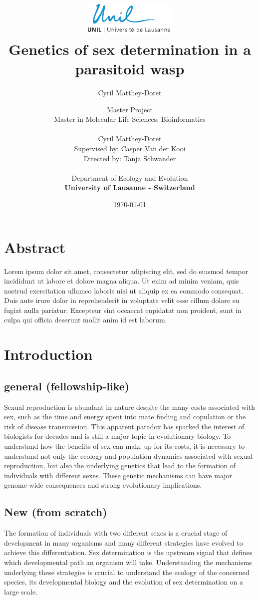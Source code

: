 \documentclass[11pt,a4paper]{report}
\author{Cyril Matthey-Doret}
\title{
\includegraphics[width=1.75in]{lo_unil06_bleu.pdf} \\
\vspace*{1in}
\textbf{Genetics of sex determination in a parasitoid wasp}}
\author{\Large{Master Project}\\
		Master in Molecular Life Sciences, Bioinformatics\\
				\vspace*{0.5in} \\
		Cyril Matthey-Doret\\
        Supervised by: Casper Van der Kooi\\
        Directed by: Tanja Schwander\\
		\vspace*{0.5in} \\
		Department of Ecology and Evolution\\
        \textbf{University of Lausanne - Switzerland}\\
       } \date{\today}
\begin{document}
\renewcommand{\headrulewidth}{1pt}
\maketitle

\section*{Abstract}
Lorem ipsum dolor sit amet, consectetur adipiscing elit, sed do eiusmod tempor incididunt ut labore et dolore magna aliqua. Ut enim ad minim veniam, quis nostrud exercitation ullamco laboris nisi ut aliquip ex ea commodo consequat. Duis aute irure dolor in reprehenderit in voluptate velit esse cillum dolore eu fugiat nulla pariatur. Excepteur sint occaecat cupidatat non proident, sunt in culpa qui officia deserunt mollit anim id est laborum.

\section*{Introduction}

\subsection*{general (fellowship-like)}
Sexual reproduction is abundant in nature despite the many costs associated with sex, such as the time and energy spent into mate finding and copulation or the risk of disease transmission. This apparent paradox has sparked the interest of biologists for decades and is still a major topic in evolutionary biology. To understand how the benefits of sex can make up for its costs, it is necessary to understand not only the ecology and population dynamics associated with sexual reproduction, but also the underlying genetics that lead to the formation of individuals with different sexes. These genetic mechanisms can have major genome-wide consequences and strong evolutionary implications. 

\subsection*{New (from scratch)}

The formation of individuals with two different sexes is a crucial stage of development in many organisms and many different strategies have evolved to achieve this differentiation. Sex determination is the upstream signal that defines which developmental path an organism will take.  Understanding the mechanisms underlying these strategies is crucial to understand the ecology of the concerned species, its developmental biology and the evolution of sex determination on a large scale.
\end{document}
